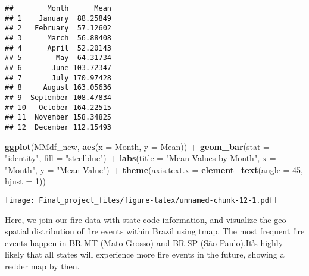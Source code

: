 \documentclass[
]{article}
\newenvironment{Shaded}{\begin{snugshade}}{\end{snugshade}}
\newcommand{\AttributeTok}[1]{\textcolor[rgb]{0.13,0.29,0.53}{#1}}
\newcommand{\DecValTok}[1]{\textcolor[rgb]{0.00,0.00,0.81}{#1}}
\newcommand{\FunctionTok}[1]{\textcolor[rgb]{0.13,0.29,0.53}{\textbf{#1}}}
\newcommand{\NormalTok}[1]{#1}
\newcommand{\SpecialCharTok}[1]{\textcolor[rgb]{0.81,0.36,0.00}{\textbf{#1}}}
\newcommand{\StringTok}[1]{\textcolor[rgb]{0.31,0.60,0.02}{#1}}
\begin{document}
\begin{verbatim}
##        Month      Mean
## 1    January  88.25849
## 2   February  57.12602
## 3      March  56.88408
## 4      April  52.20143
## 5        May  64.31734
## 6       June 103.72347
## 7       July 170.97428
## 8     August 163.05636
## 9  September 108.47834
## 10   October 164.22515
## 11  November 158.34825
## 12  December 112.15493
\end{verbatim}

\begin{Shaded}
\begin{Highlighting}[]
\FunctionTok{ggplot}\NormalTok{(MMdf\_new, }\FunctionTok{aes}\NormalTok{(}\AttributeTok{x =}\NormalTok{ Month, }\AttributeTok{y =}\NormalTok{ Mean)) }\SpecialCharTok{+}
  \FunctionTok{geom\_bar}\NormalTok{(}\AttributeTok{stat =} \StringTok{"identity"}\NormalTok{, }\AttributeTok{fill =} \StringTok{"steelblue"}\NormalTok{) }\SpecialCharTok{+}
  \FunctionTok{labs}\NormalTok{(}\AttributeTok{title =} \StringTok{"Mean Values by Month"}\NormalTok{, }\AttributeTok{x =} \StringTok{"Month"}\NormalTok{, }\AttributeTok{y =} \StringTok{"Mean Value"}\NormalTok{) }\SpecialCharTok{+}
  \FunctionTok{theme}\NormalTok{(}\AttributeTok{axis.text.x =} \FunctionTok{element\_text}\NormalTok{(}\AttributeTok{angle =} \DecValTok{45}\NormalTok{, }\AttributeTok{hjust =} \DecValTok{1}\NormalTok{))}
\end{Highlighting}
\end{Shaded}

\texttt{[image: Final\_project\_files/figure-latex/unnamed-chunk-12-1.pdf]}

Here, we join our fire data with state-code information, and visualize
the geo-spatial distribution of fire events within Brazil using tmap.
The most frequent fire events happen in BR-MT (Mato Grosso) and BR-SP
(São Paulo).It's highly likely that all states will experience more fire
events in the future, showing a redder map by then.
\end{document}
